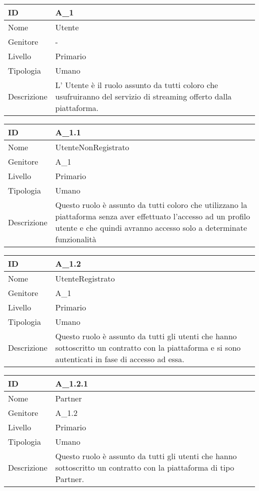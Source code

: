 \begin{center}

\begin{tabular}{ |p{2cm}|p{10cm}|  }
\hline
ID & A\_1 \\\hline
Nome & Utente\\\hline
Genitore & - \\\hline
Livello &  Primario \\\hline
Tipologia & Umano \\\hline
Descrizione &  L' Utente è il ruolo assunto da tutti coloro che usufruiranno del servizio di streaming offerto dalla piattaforma. \\\hline
\end{tabular}
\label{table_attore:1}\newline

\begin{tabular}{ |p{2cm}|p{10cm}|  }
\hline
ID & A\_1.1 \\\hline
Nome & UtenteNonRegistrato\\\hline
Genitore & A\_1 \\\hline
Livello &  Primario \\\hline
Tipologia & Umano \\\hline
Descrizione &  Questo ruolo è assunto da tutti coloro che utilizzano la piattaforma senza aver effettuato l'accesso ad un profilo utente e che quindi avranno accesso solo a determinate funzionalità \\\hline
\end{tabular}
\label{table_attore:1.1}\newline

\begin{tabular}{ |p{2cm}|p{10cm}|  }
\hline
ID & A\_1.2 \\\hline
Nome & UtenteRegistrato\\\hline
Genitore & A\_1 \\\hline
Livello &  Primario \\\hline
Tipologia & Umano \\\hline
Descrizione &  Questo ruolo è assunto da tutti gli utenti che hanno sottoscritto un contratto con la piattaforma e si sono autenticati in fase di accesso ad essa. \\\hline
\end{tabular}
\label{table_attore:1.2}\newline

\begin{tabular}{ |p{2cm}|p{10cm}|  }
\hline
ID & A\_1.2.1 \\\hline
Nome & Partner\\\hline
Genitore & A\_1.2 \\\hline
Livello &  Primario \\\hline
Tipologia & Umano \\\hline
Descrizione &  Questo ruolo è assunto da tutti gli utenti che hanno sottoscritto un contratto con la piattaforma di tipo Partner. \\\hline
\end{tabular}
\label{table_attore:1.2.1}\newline


\end{center}
